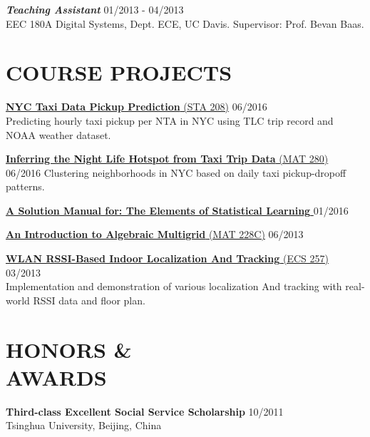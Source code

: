\documentclass[margin]{res} %
\begin{document}
\begin{resume}
        {\sl\bf Teaching
        Assistant} \hfill 01/2013 - 04/2013 \\
        EEC 180A Digital Systems, Dept. ECE, UC Davis. Supervisor: Prof. Bevan
        Baas.
        
        \section{COURSE PROJECTS}
        \href{https://github.com/huragok/STA208/tree/master/project}{{\bf NYC
        Taxi Data Pickup Prediction} (STA 208)} \hfill 06/2016 \\
        Predicting hourly taxi pickup per NTA in NYC using TLC trip record
        and NOAA weather dataset.
        
        \href{https://github.com/huragok/MAT280/tree/master/project}{{\bf
        Inferring the Night Life Hotspot from Taxi Trip Data} (MAT 280)} \hfill
        06/2016
        Clustering neighborhoods in NYC based on daily taxi
        pickup-dropoff patterns.
        
        \href{https://github.com/huragok/IDA}{\bf A Solution Manual for: The
        Elements of Statistical Learning } \hfill 01/2016
        
        \href{https://github.com/huragok/MAT228C}{{\bf An Introduction to
        Algebraic Multigrid} (MAT 228C)} \hfill 06/2013
        
        \href{https://github.com/huragok/ECS257}{{\bf WLAN RSSI-Based Indoor
        Localization And Tracking} (ECS 257)} \hfill 03/2013 \\
        Implementation and demonstration of various localization And
        tracking with real-world RSSI data and floor plan.
        
        
        
        \section{HONORS \& \\ AWARDS}
        {\bf Third-class Excellent Social Service Scholarship} \hfill 10/2011 \\
        Tsinghua University, Beijing, China
        

\end{resume}
\end{document}
